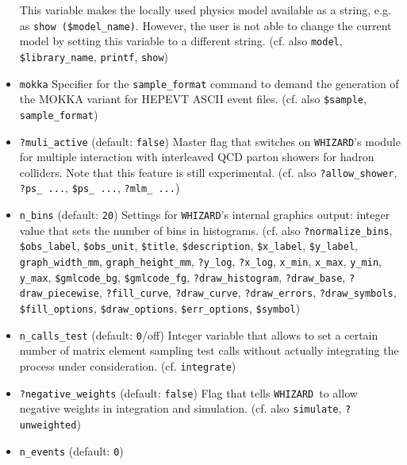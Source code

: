 \documentclass[12pt]{book}
\newcommand{\ttt}[1]{\texttt{#1}}
\newcommand{\whizard}{\texttt{WHIZARD}}
\begin{document}
\begin{itemize}
This variable makes the locally used physics model available as a
string, e.g. as \ttt{show (\$model\_name)}. However, the user is not
able to change the current model by setting this variable to a
different string. (cf. also \ttt{model}, \ttt{\$library\_name},
\ttt{printf}, \ttt{show})
\item
\ttt{mokka} \newline 
Specifier for the \ttt{sample\_format} command to demand the
generation of the MOKKA variant for HEPEVT ASCII event
files. (cf. also \ttt{\$sample}, 
\ttt{sample\_format}) 
\item
\ttt{?muli\_active} \qquad (default: \ttt{false}) \newline
Master flag that switches on \whizard's module for multiple
interaction with interleaved QCD parton showers for hadron
colliders. Note that this feature is still experimental. (cf. also
\ttt{?allow\_shower}, \ttt{?ps\_ ...}, \ttt{\$ps\_ ...}, \ttt{?mlm\_
  ...})  
\item
\ttt{n\_bins} \qquad (default: \ttt{20}) \newline
Settings for \whizard's internal graphics output: integer value that
sets the number of bins in histograms. (cf. also
\ttt{?normalize\_bins}, \ttt{\$obs\_label}, \ttt{\$obs\_unit},
\ttt{\$title}, \ttt{\$description}, \ttt{\$x\_label},
\ttt{\$y\_label}, \ttt{graph\_width\_mm}, \ttt{graph\_height\_mm},
\ttt{?y\_log}, \ttt{?x\_log}, \ttt{x\_min}, \ttt{x\_max},
\ttt{y\_min}, \ttt{y\_max}, \ttt{\$gmlcode\_bg}, \ttt{\$gmlcode\_fg},
\ttt{?draw\_histogram}, \ttt{?draw\_base}, \ttt{?draw\_piecewise},
\ttt{?fill\_curve}, \ttt{?draw\_curve}, \ttt{?draw\_errors},
\ttt{?draw\_symbols}, \newline \ttt{\$fill\_options}, \ttt{\$draw\_options},
\ttt{\$err\_options}, \ttt{\$symbol})
\item
\ttt{n\_calls\_test} \qquad (default: \ttt{0}/off) \newline
Integer variable that allows to set a certain number of matrix element
sampling test calls without actually integrating the process under
consideration. (cf. \ttt{integrate})
\item
\ttt{?negative\_weights} \qquad (default: \ttt{false}) \newline
Flag that tells \whizard\ to allow negative weights in integration and
simulation. (cf. also \ttt{simulate}, \ttt{?unweighted})
\item
\ttt{n\_events} \qquad (default: \ttt{0}) \newline

\end{itemize}
\end{document}
